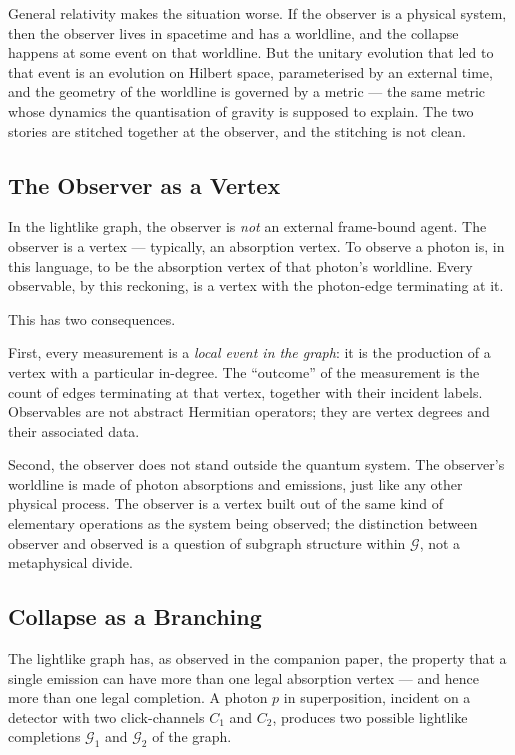 \documentclass[11pt]{article}
\begin{document}
General relativity makes the situation worse. If the observer is a physical system, then the observer lives in spacetime and has a worldline, and the collapse happens at some event on that worldline. But the unitary evolution that led to that event is an evolution on Hilbert space, parameterised by an external time, and the geometry of the worldline is governed by a metric --- the same metric whose dynamics the quantisation of gravity is supposed to explain. The two stories are stitched together at the observer, and the stitching is not clean.

\subsection{The Observer as a Vertex}

In the lightlike graph, the observer is \emph{not} an external frame-bound agent. The observer is a vertex --- typically, an absorption vertex. To observe a photon is, in this language, to be the absorption vertex of that photon's worldline. Every observable, by this reckoning, is a vertex with the photon-edge terminating at it.

This has two consequences.

First, every measurement is a \emph{local event in the graph}: it is the production of a vertex with a particular in-degree. The ``outcome'' of the measurement is the count of edges terminating at that vertex, together with their incident labels. Observables are not abstract Hermitian operators; they are vertex degrees and their associated data.

Second, the observer does not stand outside the quantum system. The observer's worldline is made of photon absorptions and emissions, just like any other physical process. The observer is a vertex built out of the same kind of elementary operations as the system being observed; the distinction between observer and observed is a question of subgraph structure within $\mathcal{G}$, not a metaphysical divide.

\subsection{Collapse as a Branching}

The lightlike graph has, as observed in the companion paper, the property that a single emission can have more than one legal absorption vertex --- and hence more than one legal completion. A photon $p$ in superposition, incident on a detector with two click-channels $C_1$ and $C_2$, produces two possible lightlike completions $\mathcal{G}_1$ and $\mathcal{G}_2$ of the graph.
\end{document}
